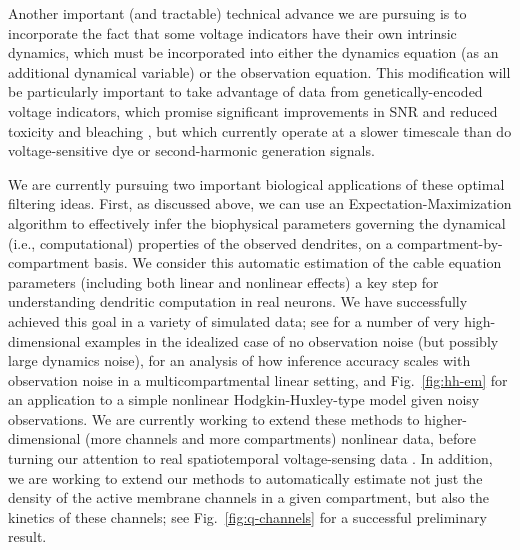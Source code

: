 \documentclass[12pt]{article}
\begin{document}
Another important (and tractable) technical advance we are pursuing is
to incorporate the fact that some voltage indicators have their own
intrinsic dynamics, which must be incorporated into either the
dynamics equation (as an additional dynamical variable) or the
observation equation.  This modification will be particularly
important to take advantage of data from genetically-encoded voltage
indicators, which promise significant improvements in SNR and reduced
toxicity and bleaching \cite{Knopfel06}, but which currently operate
at a slower timescale than do voltage-sensitive dye or second-harmonic
generation signals.

We are currently pursuing two important biological applications of
these optimal filtering ideas.  First, as discussed above, we can use
an Expectation-Maximization algorithm to effectively infer the
biophysical parameters governing the dynamical (i.e., computational)
properties of the observed dendrites, on a compartment-by-compartment
basis.  We consider this automatic estimation of the cable equation
parameters (including both linear and nonlinear effects) a key step
for understanding dendritic computation in real neurons.  We have
successfully achieved this goal in a variety of simulated data; see
\cite{HAP06} for a number of very high-dimensional examples in the
idealized case of no observation noise (but possibly large dynamics
noise), \cite{HP06} for an analysis of how inference accuracy scales
with observation noise in a multicompartmental linear setting, and
Fig.~\ref{fig:hh-em} for an application to a simple nonlinear
Hodgkin-Huxley-type model given noisy observations.  We are currently
working to extend these methods to higher-dimensional (more channels
and more compartments) nonlinear data, before turning our attention to
real spatiotemporal voltage-sensing data \cite{Djurisic08}.  In
addition, we are working to extend our methods to automatically
estimate not just the density of the active membrane channels in a
given compartment, but also the kinetics of these channels; see
Fig.~\ref{fig:q-channels} for a successful preliminary result.
\end{document}
